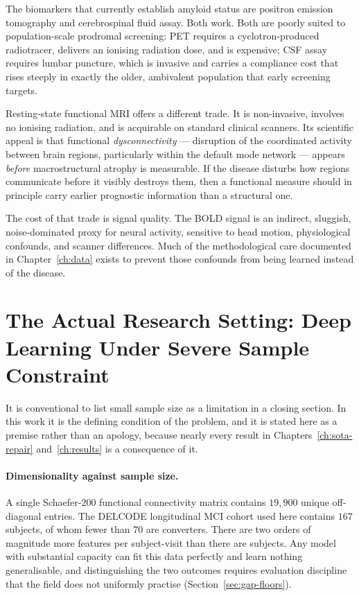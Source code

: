The biomarkers that currently establish amyloid status are positron emission tomography
and cerebrospinal fluid assay. Both work. Both are poorly suited to population-scale
prodromal screening: PET requires a cyclotron-produced radiotracer, delivers an ionising
radiation dose, and is expensive; CSF assay requires lumbar puncture, which is invasive
and carries a compliance cost that rises steeply in exactly the older, ambivalent
population that early screening targets.

Resting-state functional MRI offers a different trade. It is non-invasive, involves no
ionising radiation, and is acquirable on standard clinical scanners. Its scientific appeal
is that functional \emph{dysconnectivity} --- disruption of the coordinated activity
between brain regions, particularly within the default mode network --- appears
\emph{before} macrostructural atrophy is measurable. If the disease disturbs how regions
communicate before it visibly destroys them, then a functional measure should in principle
carry earlier prognostic information than a structural one.

The cost of that trade is signal quality. The BOLD signal is an indirect, sluggish,
noise-dominated proxy for neural activity, sensitive to head motion, physiological
confounds, and scanner differences. Much of the methodological care documented in
Chapter~\ref{ch:data} exists to prevent those confounds from being learned instead of the
disease.

\section{The Actual Research Setting: Deep Learning Under Severe Sample Constraint}
\label{sec:setting}

It is conventional to list small sample size as a limitation in a closing section. In this
work it is the defining condition of the problem, and it is stated here as a premise rather
than an apology, because nearly every result in Chapters~\ref{ch:sota-repair}
and~\ref{ch:results} is a consequence of it.

\paragraph{Dimensionality against sample size.} A single Schaefer-200 functional
connectivity matrix contains $19{,}900$ unique off-diagonal entries. The DELCODE
longitudinal MCI cohort used here contains $167$ subjects, of whom fewer than $70$ are
converters. There are two orders of magnitude more features per subject-visit than there
are subjects. Any model with substantial capacity can fit this data perfectly and learn
nothing generalisable, and distinguishing the two outcomes requires evaluation discipline
that the field does not uniformly practise (Section~\ref{sec:gap-floors}).

